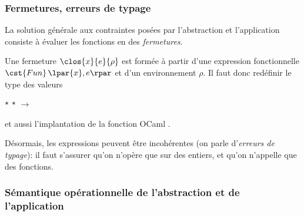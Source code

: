 %
\begin{frame}
\frametitle{Fermetures, erreurs de typage}

\label{erreurs_de_typage}

La solution générale aux contraintes posées par l'abstraction et
l'application consiste à évaluer les fonctions en des
\emph{fermetures}.

\bigskip

Une fermeture $\clos{x}{e}{\rho}$ est formée à partir d'une expression
fonctionnelle $\cst{Fun} \, \lpar{x},e\rpar$ et d'un environnement
$\rho$. Il faut donc redéfinir le type des valeurs

\bigskip

\Xtype {} \equal {} \Xof {} \vbar
{} \Xof {} \texttt{*}  \texttt{*}
\lpar{} $\rightarrow$ \rpar\semi{}

\bigskip

et aussi l'implantation de la fonction OCaml .

\bigskip

\remarque \quad Désormais, les expressions peuvent être incohérentes
(on parle d'\emph{erreurs de typage}): il faut s'assurer qu'on
n'opère que sur des entiers, et qu'on n'appelle que des fonctions.

\end{frame}

%
\begin{frame}
\frametitle{Sémantique opérationnelle de l'abstraction et de l'application}
\label{abs-app}

\end{frame}


